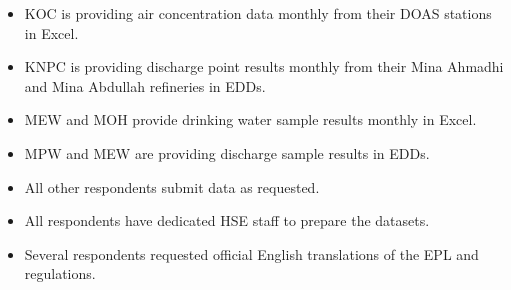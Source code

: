 \begin{itemize}
\item KOC is providing air concentration data monthly from their DOAS stations in Excel.
\item KNPC is providing discharge point results monthly from their Mina Ahmadhi and Mina Abdullah refineries in EDDs.
\item MEW and MOH provide drinking water sample results monthly in Excel.
\item MPW and MEW are providing discharge sample results in EDDs.
\item All other respondents submit data as requested.
\item All respondents have dedicated HSE staff to prepare the datasets.
\item Several respondents requested official English translations of the EPL and regulations.
\end{itemize}

